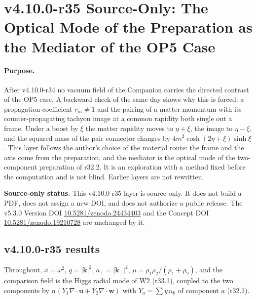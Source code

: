 \clearpage
\section*{v4.10.0-r35 Source-Only: The Optical Mode of the Preparation as the Mediator of the OP5 Case}
\label{sec:v4100-r35-material-mediator}

\paragraph{Purpose.}
After v4.10.0-r34 no vacuum field of the Companion carries the directed contrast of the OP5 case.  A backward check of the same day shows
why this is forced: a propagation coefficient \(r_m\neq1\) and the pairing of a matter momentum with its counter-propagating tachyon image at a
common rapidity both single out a frame.  Under a boost by \(\xi\) the matter rapidity moves to \(\eta+\xi\), the image to \(\eta-\xi\), and the
squared mass of the pair connector changes by \(4m^2\cosh(2\eta+\xi)\sinh\xi\).  This layer follows the author's choice of the material route:
the frame and the axis come from the preparation, and the mediator is the optical mode of the two-component preparation of r32.2.  It is an
exploration with a method fixed before the computation and is not blind.  Earlier layers are not rewritten.

\noindent\textbf{Source-only status.}
This v4.10.0-r35 layer is source-only.  It does not build a PDF, does not assign a new DOI,
and does not authorize a public release.  The v5.3.0 Version DOI
\href{https://doi.org/10.5281/zenodo.24434403}{10.5281/zenodo.24434403} and the Concept DOI
\href{https://doi.org/10.5281/zenodo.19210728}{10.5281/zenodo.19210728} are unchanged by it.

\subsection*{v4.10.0-r35 results}
\label{subsec:v4100-r35-results}

Throughout, \(x=\omega^2\), \(q=|\mathbf k|^2\), \(a_\perp=|\mathbf k_\perp|^2\), \(\mu=\rho_1\rho_2/(\rho_1+\rho_2)\), and the comparison field is the Higgs radial mode of
W2 (r33.1), coupled to the two components by \(\eta\,(Y_1\nabla\cdot\mathbf u+Y_2\nabla\cdot\mathbf w)\) with \(Y_a=\sum y\,n_0\) of component \(a\) (r32.1).


